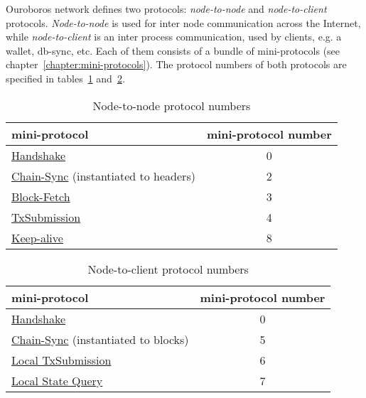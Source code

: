 Ouroboros network defines two protocols: \emph{node-to-node} and
\emph{node-to-client} protocols.  \emph{Node-to-node} is used for inter node
communication across the Internet, while \emph{node-to-client} is an inter
process communication, used by clients, e.g. a wallet, db-sync, etc.  Each of them consists of a bundle of mini-protocols (see chapter~\ref{chapter:mini-protocols}).
The protocol numbers of both protocols
are specified in tables~\ref{table:node-to-node-protocol-numbers}
and~\ref{table:node-to-client-protocol-numbers}.
\begin{table}[ht]
  \begin{center}
    \begin{tabular}{l|c}
      mini-protocol                                                      & mini-protocol number \\\hline
      \hyperref[handshake-protocol]{Handshake}                           & 0  \\
      \hyperref[chain-sync-protocol]{Chain-Sync} \small{(instantiated to headers)} & 2  \\
      \hyperref[block-fetch-protocol]{Block-Fetch}                       & 3  \\
      \hyperref[tx-submission-protocol]{TxSubmission}                    & 4  \\
      \hyperref[keep-alive-protocol]{Keep-alive}                         & 8  \\
    \end{tabular}
  \end{center}
  \caption{Node-to-node protocol numbers}
  \label{table:node-to-node-protocol-numbers}
\end{table}
\begin{table}[ht]
  \begin{center}
    \begin{tabular}{l|c}
      mini-protocol                                                     & mini-protocol number \\\hline
      \hyperref[handshake-protocol]{Handshake}                          & 0 \\
      \hyperref[chain-sync-protocol]{Chain-Sync} \small{(instantiated to blocks)} & 5 \\
      \hyperref[local-tx-submission-protocol]{Local TxSubmission}       & 6 \\
      \hyperref[local-state-query-protocol]{Local State Query}          & 7 \\
    \end{tabular}
  \end{center}
  \caption{Node-to-client protocol numbers}
  \label{table:node-to-client-protocol-numbers}
\end{table}
